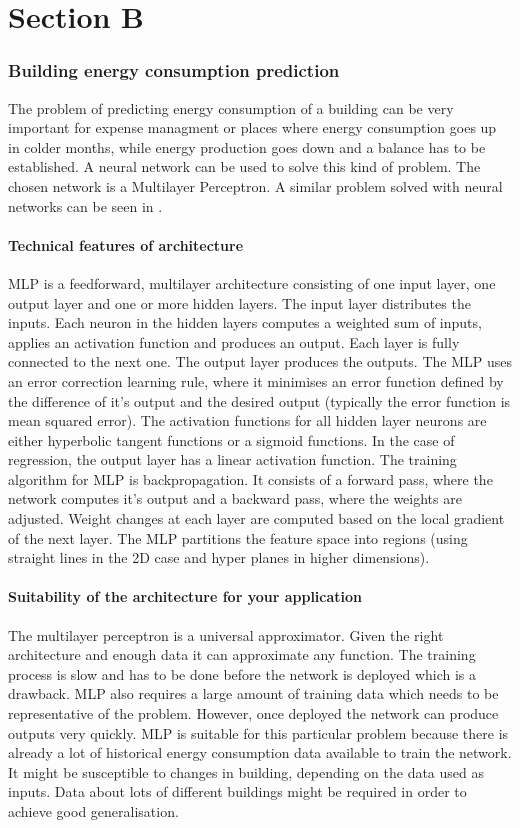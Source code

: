 \documentclass[a4paper, 11pt]{article}
\begin{document}
\part*{Section B}


\section{Building energy consumption prediction}
The problem of predicting energy consumption of a building can be very important for expense managment or places where energy consumption goes up in colder months, while energy production goes down and a balance has to be established. A neural network can be used to solve this kind of problem. The chosen network is a Multilayer Perceptron. A similar problem solved with neural networks can be seen in \cite{khosravani2016comparison}.
\subsection{Technical features of architecture}
MLP is a feedforward, multilayer architecture consisting of one input layer, one output layer and one or more hidden layers. The input layer distributes the inputs. Each neuron in the hidden layers computes a weighted sum of inputs, applies an activation function and produces an output. Each layer is fully connected to the next one. The output layer produces the outputs. The MLP uses an error correction learning rule, where it minimises an error function defined by the difference of it's output and the desired output (typically the error function is mean squared error). The activation functions for all hidden layer neurons are either hyperbolic tangent functions or a sigmoid functions. In the case of regression, the output layer has a linear activation function. The training algorithm for MLP is backpropagation. It consists of a forward pass, where the network computes it's output and a backward pass, where the weights are adjusted. Weight changes at each layer are computed based on the local gradient of the next layer. The MLP partitions the feature space into regions (using straight lines in the 2D case and hyper planes in higher dimensions). 
\subsection{Suitability of the architecture for your application}
The multilayer perceptron is a universal approximator. Given the right architecture and enough data it can approximate any function. The training process is slow and has to be done before the network is deployed which is a drawback. MLP also requires a large amount of training data which needs to be representative of the problem. However, once deployed the network can produce outputs very quickly. MLP is suitable for this particular problem because there is already a lot of historical energy consumption data available to train the network. It might be susceptible to changes in building, depending on the data used as inputs. Data about lots of different buildings might be required in order to achieve good generalisation.
\end{document}
